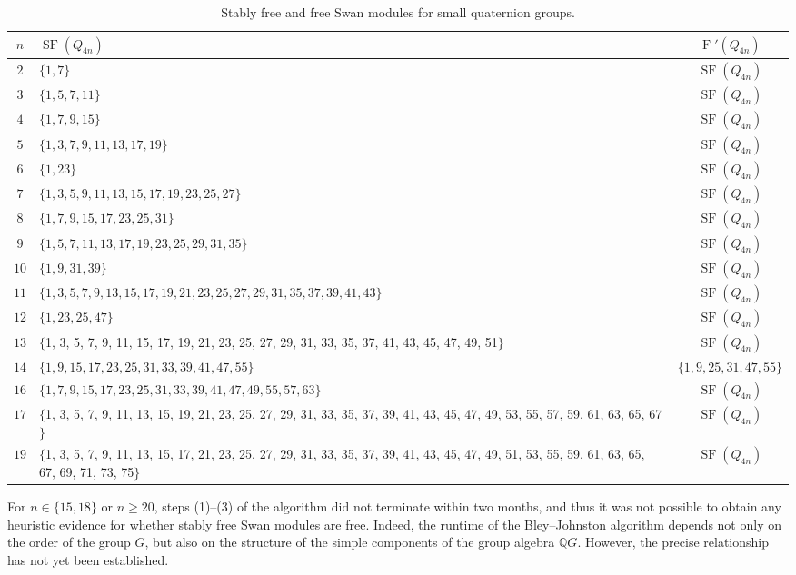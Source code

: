 \documentclass[11pt,leqno,a4paper]{amsart}
\newcommand{\Q}{\mathbb{Q}}
\DeclareMathOperator{\SF}{SF}
\DeclareMathOperator{\FF}{F}
\theoremstyle{definition}
\theoremstyle{remark}
\theoremstyle{custom}
\begin{document}
\begin{table}[h]
\centering
\begin{tabular}{|c|P{11.5cm}|c|} 
\hline
$n$ & $\SF(Q_{4n})$ & $\FF'(Q_{4n})$ \\
\hline
$2$ & $\{1,7\}$ & $\SF(Q_{4n})$ \\
$3$ & $\{1,5, 7, 11\}$ & $\SF(Q_{4n})$ \\
$4$ & $\{1,7, 9, 15 \}$ & $\SF(Q_{4n})$ \\
$5$ & $\{1, 3, 7, 9, 11, 13, 17, 19\}$ & $\SF(Q_{4n})$ \\
$6$ & $\{1,23\}$ & $\SF(Q_{4n})$ \\
$7$ & $\{1, 3, 5, 9, 11, 13, 15, 17, 19, 23, 25, 27\}$ & $\SF(Q_{4n})$ \\
$8$ & $\{1, 7, 9, 15, 17, 23, 25, 31\}$ & $\SF(Q_{4n})$ \\
$9$ & $\{1, 5, 7, 11, 13, 17, 19, 23, 25, 29, 31, 35\}$ & $\SF(Q_{4n})$ \\
$10$ & $\{1, 9, 31, 39\}$ & $\SF(Q_{4n})$ \\
$11$ & $\{1, 3, 5, 7, 9, 13, 15, 17, 19, 21, 23, 25, 27, 29, 31, 35, 37, 39, 41, 43\}$ & $\SF(Q_{4n})$ \\
$12$ & $\{1, 23, 25, 47\}$ & $\SF(Q_{4n})$ \\
$13$ & $\{$1, 3, 5, 7, 9, 11, 15, 17, 19,
21, 23, 25, 27, 29, 31, 33, 35, 37, 41, 43, 45, 47, 49, 51$\}$
 & $\SF(Q_{4n})$ \\
$14$ & $\{1, 9, 15, 17, 23, 25, 31, 33, 39, 41, 47, 55\}$ & $\{1, 9, 25, 31, 47, 55\}$  \\
$16$ & $\{1, 7, 9, 15, 17, 23, 25, 31, 33, 39, 41, 47, 49, 55, 57, 63\}$ & $\SF(Q_{4n})$ \\
$17$ & $\{$1, 3, 5, 7, 9, 11, 13, 15, 19, 21, 23, 25, 27, 29, 31, 33, 35, 37, 39, 41, 43, 45, 47, 49, 53, 55, 57, 59, 61, 63, 65, 67$\}$ & $\SF(Q_{4n})$ \\
$19$ & $\{$1, 3, 5, 7, 9, 11, 13, 15, 17, 21, 23, 25, 27, 29, 31, 33, 35, 37, 39, 41, 43, 45, 47, 49, 51, 53, 55, 59, 61, 63, 65, 67, 69, 71, 73, 75$\}$ & $\SF(Q_{4n})$ \\
\hline
\end{tabular}
\vspace{2mm}
\caption{Stably free and free Swan modules for small quaternion groups.}
\vspace{-2mm}
\label{table:experiment}
\end{table}

For $n \in \{15,18\}$ or $n\geq 20$, steps (1)--(3) of the algorithm did not terminate within two months, and thus it was not possible to obtain any heuristic evidence for whether stably free Swan modules are free. 
Indeed, the runtime of the Bley--Johnston algorithm depends not only on the order of the group $G$, but also on the structure of the simple components of the group algebra $\Q G$.
However, the precise relationship has not yet been established.
\end{document}

